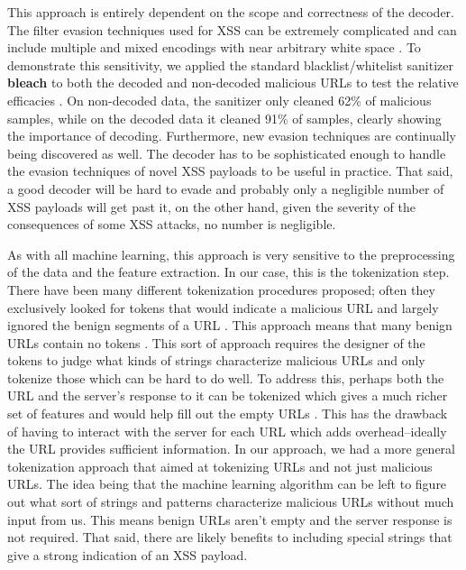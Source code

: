 This approach is entirely dependent on the scope and correctness of the decoder. The filter evasion techniques used for XSS can be extremely complicated and can include multiple and mixed encodings with near arbitrary white space \cite{xsscheat}. To demonstrate this sensitivity, we applied the standard blacklist/whitelist sanitizer \textbf{bleach} to both the decoded and non-decoded malicious URLs to test the relative efficacies \cite{bleach}. On non-decoded data, the sanitizer only cleaned 62\% of malicious samples, while on the decoded data it cleaned 91\% of samples, clearly showing the importance of decoding. Furthermore, new evasion techniques are continually being discovered as well. The decoder has to be sophisticated enough to handle the evasion techniques of novel XSS payloads to be useful in practice. That said, a good decoder will be hard to evade and probably only a negligible number of XSS payloads will get past it, on the other hand, given the severity of the consequences of some XSS attacks, no number is negligible. 

As with all machine learning, this approach is very sensitive to the preprocessing of the data and the feature extraction. In our case, this is the tokenization step. There have been many different tokenization procedures proposed; often they exclusively looked for tokens that would indicate a malicious URL and largely ignored the benign segments of a URL \cite{fang2018deepxss}\cite{mokbal2019mlpxss}. This approach means that many benign URLs contain no tokens \cite{zhang2019cross}. This sort of approach requires the designer of the tokens to judge what kinds of strings characterize malicious URLs and only tokenize those which can be hard to do well. To address this, perhaps both the URL and the server's response to it can be tokenized which gives a much richer set of features and would help fill out the empty URLs \cite{zhang2019cross}. This has the drawback of having to interact with the server for each URL which adds overhead--ideally the URL provides sufficient information. In our approach, we had a more general tokenization approach that aimed at tokenizing URLs and not just malicious URLs. The idea being that the machine learning algorithm can be left to figure out what sort of strings and patterns characterize malicious URLs without much input from us. This means benign URLs aren't empty and the server response is not required. That said, there are likely benefits to including special strings that give a strong indication of an XSS payload. 

